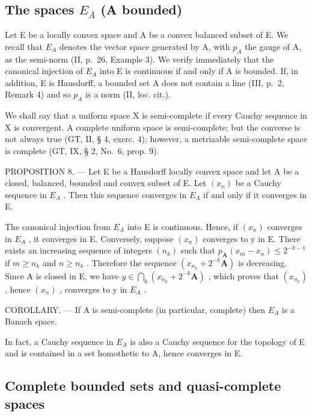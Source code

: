 \subsection{\texorpdfstring{The spaces \(E_{A}\) (A bounded)}{The spaces E\_\{A\} (A bounded)}}

Let E be a locally convex space and A be a convex balanced subset of E. We recall that \(E_{A}\) denotes the vector space generated by A, with \(p_{A}\) the gauge of A, as the semi-norm (II, p.~26, Example 3). We verify immediately that the canonical injection of \(E_{A}\) into E is continuous if and only if A is bounded. If, in addition, E is Hausdorff, a bounded set A does not contain a line (III, p.~2, Remark 4) and so \(p_{A}\) is a norm (II, loc. cit.).

We shall say that a uniform space X is semi-complete if every Cauchy sequence in X is convergent. A complete uniform space is semi-complete; but the converse is not always true (GT, II, § 4, exerc. 4); however, a metrizable semi-complete space is complete (GT, IX, § 2, No.~6, prop. 9).

PROPOSITION 8. --- Let E be a Hausdorff locally convex space and let A be a closed, balanced, bounded and convex subset of E. Let \((x_{n})\) be a Cauchy sequence in \(E_{A}\) . Then this sequence converges in \(E_{A}\) if and only if it converges in E.

The canonical injection from \(E_{A}\) into E is continuous. Hence, if \((x_{n})\) converges in \(E_{A}\) , it converges in E. Conversely, suppose \((x_{n})\) converges to y in E. There exists an increasing sequence of integers \((n_{k})\) such that \(p_{\mathbf{A}}(x_{m}-x_{n}) \leqslant 2^{-k-1}\) if \(m \geqslant n_{k}\) and \(n \geqslant n_{k}\) . Therefore the sequence \((x_{n_{k}} + 2^{-k}\mathbf{A})\) is decreasing. Since A is closed in E, we have \(y \in \bigcap_{k} (x_{n_{k}} + 2^{-k}\mathbf{A})\) , which proves that \((x_{n_{k}})\) , hence \((x_{n})\) , converges to y in \(E_{A}\) .

COROLLARY. --- If A is semi-complete (in particular, complete) then \(E_{A}\) is a Banach space.

In fact, a Cauchy sequence in \(E_{A}\) is also a Cauchy sequence for the topology of E and is contained in a set homothetic to A, hence converges in E.

\subsection{Complete bounded sets and quasi-complete spaces}

